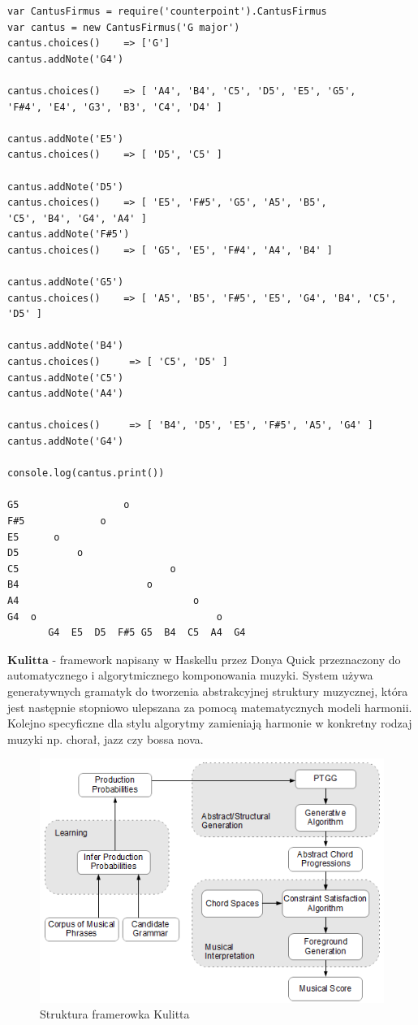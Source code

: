 \begin{lstlisting}[caption={}, captionpos=b]
var CantusFirmus = require('counterpoint').CantusFirmus
var cantus = new CantusFirmus('G major')
cantus.choices()    => ['G']
cantus.addNote('G4')

cantus.choices()    => [ 'A4', 'B4', 'C5', 'D5', 'E5', 'G5',
'F#4', 'E4', 'G3', 'B3', 'C4', 'D4' ]

cantus.addNote('E5')
cantus.choices()    => [ 'D5', 'C5' ]   

cantus.addNote('D5')
cantus.choices()    => [ 'E5', 'F#5', 'G5', 'A5', 'B5',
'C5', 'B4', 'G4', 'A4' ]
cantus.addNote('F#5')
cantus.choices()    => [ 'G5', 'E5', 'F#4', 'A4', 'B4' ]

cantus.addNote('G5')
cantus.choices()    => [ 'A5', 'B5', 'F#5', 'E5', 'G4', 'B4', 'C5', 'D5' ]

cantus.addNote('B4')
cantus.choices()     => [ 'C5', 'D5' ]
cantus.addNote('C5')
cantus.addNote('A4')

cantus.choices()     => [ 'B4', 'D5', 'E5', 'F#5', 'A5', 'G4' ]
cantus.addNote('G4')

console.log(cantus.print())

G5                  o
F#5             o
E5      o
D5          o
C5                          o
B4                      o
A4                              o
G4  o                               o
	   G4  E5  D5  F#5 G5  B4  C5  A4  G4

\end{lstlisting}

$\textbf{Kulitta}$ - framework napisany w Haskellu przez Donya Quick przeznaczony do automatycznego i algorytmicznego komponowania muzyki. System używa generatywnych gramatyk do tworzenia abstrakcyjnej struktury muzycznej, która jest następnie stopniowo ulepszana za pomocą matematycznych modeli harmonii. Kolejno specyficzne dla stylu algorytmy zamieniają harmonie w konkretny rodzaj muzyki np. chorał, jazz czy bossa nova.

\begin{figure}[H]
	\centering
	\includegraphics[width=0.7\linewidth]{kulitta_diagram}
	\caption{Struktura framerowka Kulitta}
	\label{fig:kulittadiagram}
\end{figure}
 
